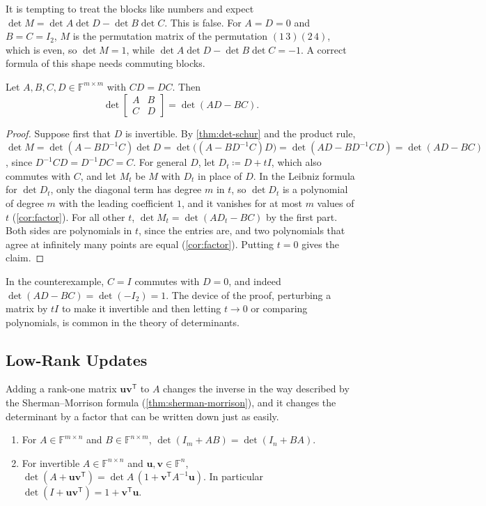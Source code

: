 It is tempting to treat the blocks like numbers and expect $\det M=\det A\det D-\det B\det C$. This is false. For $A=D=0$ and $B=C=I_2$, $M$ is the permutation matrix of the permutation $(1\,3)(2\,4)$, which is even, so $\det M=1$, while $\det A\det D-\det B\det C=-1$. A correct formula of this shape needs commuting blocks.

\begin{proposition}
\label{prop:commuting-blocks}
Let $A,B,C,D\in\mathbb F^{m\times m}$ with $CD=DC$. Then
\[
\det\begin{bmatrix}A&B\\C&D\end{bmatrix}=\det(AD-BC).
\]
\end{proposition}

\begin{proof}
Suppose first that $D$ is invertible. By \cref{thm:det-schur} and the product rule, $\det M=\det(A-BD^{-1}C)\det D=\det\bigl((A-BD^{-1}C)D\bigr)=\det(AD-BD^{-1}CD)=\det(AD-BC)$, since $D^{-1}CD=D^{-1}DC=C$. For general $D$, let $D_t\coloneqq D+tI$, which also commutes with $C$, and let $M_t$ be $M$ with $D_t$ in place of $D$. In the Leibniz formula for $\det D_t$, only the diagonal term has degree $m$ in $t$, so $\det D_t$ is a polynomial of degree $m$ with the leading coefficient $1$, and it vanishes for at most $m$ values of $t$ (\cref{cor:factor}). For all other $t$, $\det M_t=\det(AD_t-BC)$ by the first part. Both sides are polynomials in $t$, since the entries are, and two polynomials that agree at infinitely many points are equal (\cref{cor:factor}). Putting $t=0$ gives the claim.
\end{proof}

In the counterexample, $C=I$ commutes with $D=0$, and indeed $\det(AD-BC)=\det(-I_2)=1$. The device of the proof, perturbing a matrix by $tI$ to make it invertible and then letting $t\to0$ or comparing polynomials, is common in the theory of determinants.

\subsection{Low-Rank Updates}

Adding a rank-one matrix $\mathbf u\mathbf v^{\mathsf T}$ to $A$ changes the inverse in the way described by the Sherman--Morrison formula (\cref{thm:sherman-morrison}), and it changes the determinant by a factor that can be written down just as easily.

\begin{theorem}
\label{thm:det-lemma}
\leavevmode
\begin{enumerate}
\item For $A\in\mathbb F^{m\times n}$ and $B\in\mathbb F^{n\times m}$, $\det(I_m+AB)=\det(I_n+BA)$.
\item For invertible $A\in\mathbb F^{n\times n}$ and $\mathbf u,\mathbf v\in\mathbb F^n$, $\det(A+\mathbf u\mathbf v^{\mathsf T})=\det A\,(1+\mathbf v^{\mathsf T}A^{-1}\mathbf u)$. In particular $\det(I+\mathbf u\mathbf v^{\mathsf T})=1+\mathbf v^{\mathsf T}\mathbf u$.
\end{enumerate}
\end{theorem}


